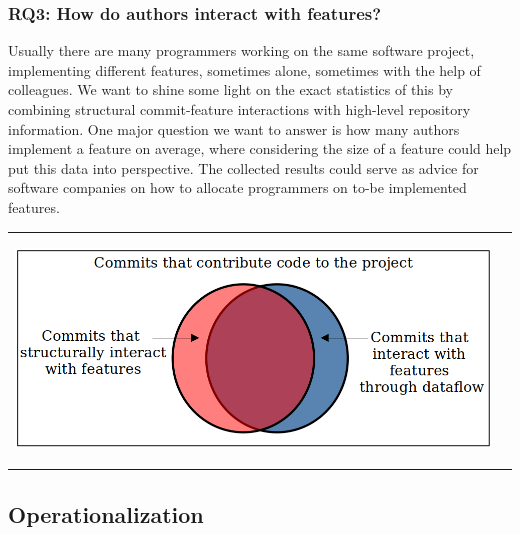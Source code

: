 \subsubsection*{\textbf{RQ3: How do authors interact with features?}}

Usually there are many programmers working on the same software project, implementing different features, sometimes alone, sometimes with the help of colleagues.
We want to shine some light on the exact statistics of this by combining structural commit-feature interactions with high-level repository information.
One major question we want to answer is how many authors implement a feature on average, where considering the size of a feature could help put this data into perspective.
The collected results could serve as advice for software companies on how to allocate programmers on to-be implemented features. 

\begin{center}
\begin{tabular}{cc}
\includegraphics[height=6cm]{gfx/Commits-of-a-Software-Project.png}
\end{tabular}
\end{center}

\subsection{Operationalization}\label{sec:operationalization}

